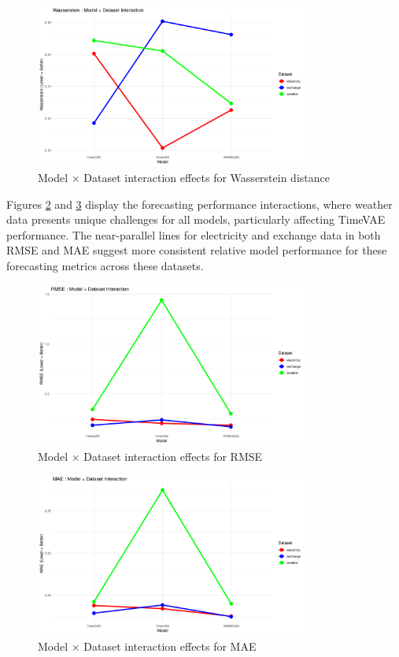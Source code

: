 \documentclass{article}
\begin{document}
\begin{figure}[H]
\centering
\includegraphics[width=0.8\textwidth]{assets/interaction_wasserstein.png}
\caption{Model × Dataset interaction effects for Wasserstein distance}
\label{fig:wasserstein_interaction}
\end{figure}

Figures \ref{fig:rmse_interaction} and \ref{fig:mae_interaction} display the forecasting performance interactions, where weather data presents unique challenges for all models, particularly affecting TimeVAE performance. The near-parallel lines for electricity and exchange data in both RMSE and MAE suggest more consistent relative model performance for these forecasting metrics across these datasets.

\begin{figure}[H]
\centering
\includegraphics[width=0.8\textwidth]{assets/interaction_rmse.png}
\caption{Model × Dataset interaction effects for RMSE}
\label{fig:rmse_interaction}
\end{figure}

\begin{figure}[H]
\centering
\includegraphics[width=0.8\textwidth]{assets/interaction_mae.png}
\caption{Model × Dataset interaction effects for MAE}
\label{fig:mae_interaction}
\end{figure}
\end{document}
